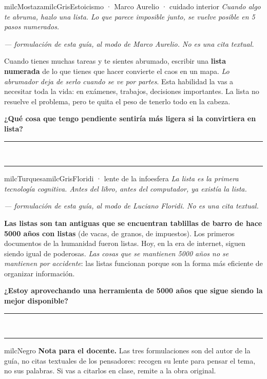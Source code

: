 \documentclass[11pt,letterpaper]{article}
\newcommand{\linead}[1]{\noindent\color{milcLinea}\rule{#1}{0.5pt}\color{milcNegro}}
\begin{document}
\begin{softbox}{milcMostaza}{milcGris}{Estoicismo · Marco Aurelio · cuidado interior}
\textit{Cuando algo te abruma, hazlo una lista. Lo que parece imposible junto, se vuelve posible en 5 pasos numerados.}

{\footnotesize\itshape\color{milcNegro!70}--- formulación de esta guía, al modo de Marco Aurelio. No es una cita textual.}

Cuando tienes muchas tareas y te sientes abrumado, escribir una \textbf{lista numerada} de lo que tienes que hacer convierte el caos en un mapa. \emph{Lo abrumador deja de serlo cuando se ve por partes}. Esta habilidad la vas a necesitar toda la vida: en exámenes, trabajos, decisiones importantes. La lista no resuelve el problema, pero te quita el peso de tenerlo todo en la cabeza.

\textbf{¿Qué cosa que tengo pendiente sentiría más ligera si la convirtiera en lista?}
\end{softbox}
\linead{\linewidth}\\[1mm]
\linead{\linewidth}

\begin{softbox}{milcTurquesa}{milcGris}{Floridi · lente de la infoesfera}
\textit{La lista es la primera tecnología cognitiva. Antes del libro, antes del computador, ya existía la lista.}

{\footnotesize\itshape\color{milcNegro!70}--- formulación de esta guía, al modo de Luciano Floridi. No es una cita textual.}

\textbf{Las listas son tan antiguas que se encuentran tablillas de barro de hace 5000 años con listas} (de vacas, de granos, de impuestos). Los primeros documentos de la humanidad fueron listas. Hoy, en la era de internet, siguen siendo igual de poderosas. \emph{Las cosas que se mantienen 5000 años no se mantienen por accidente}: las listas funcionan porque son la forma más eficiente de organizar información.

\textbf{¿Estoy aprovechando una herramienta de 5000 años que sigue siendo la mejor disponible?}
\end{softbox}
\linead{\linewidth}\\[1mm]
\linead{\linewidth}

\begin{infoband}{milcNegro}
\textbf{Nota para el docente.} Las tres formulaciones son del autor de la guía, no citas textuales de los pensadores: recogen su lente para pensar el tema, no sus palabras. Si vas a citarlos en clase, remite a la obra original.
\end{infoband}
\end{document}
